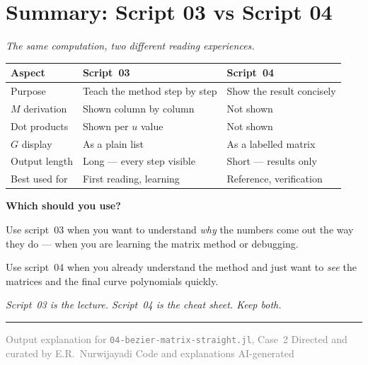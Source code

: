 \documentclass[12pt, a4paper]{article}
\begin{document}
\section{Summary: Script 03 vs Script 04}

\textit{The same computation, two different reading experiences.}

\begin{center}
\begin{tabular}{lll}
\toprule
Aspect & Script~03 & Script~04 \\
\midrule
Purpose & Teach the method step by step & Show the result concisely \\
$M$ derivation & Shown column by column & Not shown \\
Dot products & Shown per $u$ value & Not shown \\
$G$ display & As a plain list & As a labelled matrix \\
Output length & Long --- every step visible & Short --- results only \\
Best used for & First reading, learning & Reference, verification \\
\bottomrule
\end{tabular}
\end{center}

\begin{notebox}
\textbf{Which should you use?}

Use script~03 when you want to understand \emph{why}
the numbers come out the way they do ---
when you are learning the matrix method or debugging.

Use script~04 when you already understand the method
and just want to \emph{see} the matrices and the final
curve polynomials quickly.

\textit{Script~03 is the lecture.
Script~04 is the cheat sheet.
Keep both.}
\end{notebox}

\vspace{2em}\hrule\vspace{0.5em}
{\small\textcolor{gray}{%
Output explanation for \texttt{04-bezier-matrix-straight.jl}, Case~2
\textbar{} Directed and curated by E.R.\ Nurwijayadi
\textbar{} Code and explanations AI-generated}}
\end{document}
